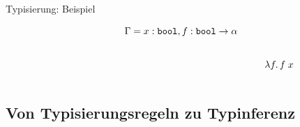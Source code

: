 \documentclass{beamer}
\begin{document}
\begin{frame}{Typisierung: Beispiel}
{    \begin{equation*}
      \Gamma = x : \texttt{bool}, f : \texttt{bool} \to \alpha
    \end{equation*}

    \begin{columns}
      \begin{column}{0.5\textwidth}
        \begin{figure}
        \end{figure}
      \end{column}
      \begin{column}{0.35\textwidth}
        \begin{equation*}
          \lambda f.\, f\;x
        \end{equation*}
      \end{column}
    \end{columns}
  }
\end{frame}

\subsection{Von Typisierungsregeln zu Typinferenz}
\end{document}
